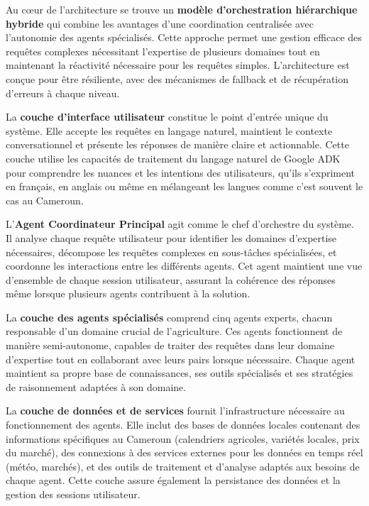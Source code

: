 Au cœur de l'architecture se trouve un \textbf{modèle d'orchestration hiérarchique hybride} qui combine les avantages d'une coordination centralisée avec l'autonomie des agents spécialisés. Cette approche permet une gestion efficace des requêtes complexes nécessitant l'expertise de plusieurs domaines tout en maintenant la réactivité nécessaire pour les requêtes simples. L'architecture est conçue pour être résiliente, avec des mécanismes de fallback et de récupération d'erreurs à chaque niveau.

La \textbf{couche d'interface utilisateur} constitue le point d'entrée unique du système. Elle accepte les requêtes en langage naturel, maintient le contexte conversationnel et présente les réponses de manière claire et actionnable. Cette couche utilise les capacités de traitement du langage naturel de Google ADK pour comprendre les nuances et les intentions des utilisateurs, qu'ils s'expriment en français, en anglais ou même en mélangeant les langues comme c'est souvent le cas au Cameroun.

L'\textbf{Agent Coordinateur Principal} agit comme le chef d'orchestre du système. Il analyse chaque requête utilisateur pour identifier les domaines d'expertise nécessaires, décompose les requêtes complexes en sous-tâches spécialisées, et coordonne les interactions entre les différents agents. Cet agent maintient une vue d'ensemble de chaque session utilisateur, assurant la cohérence des réponses même lorsque plusieurs agents contribuent à la solution.

La \textbf{couche des agents spécialisés} comprend cinq agents experts, chacun responsable d'un domaine crucial de l'agriculture. Ces agents fonctionnent de manière semi-autonome, capables de traiter des requêtes dans leur domaine d'expertise tout en collaborant avec leurs pairs lorsque nécessaire. Chaque agent maintient sa propre base de connaissances, ses outils spécialisés et ses stratégies de raisonnement adaptées à son domaine.

La \textbf{couche de données et de services} fournit l'infrastructure nécessaire au fonctionnement des agents. Elle inclut des bases de données locales contenant des informations spécifiques au Cameroun (calendriers agricoles, variétés locales, prix du marché), des connexions à des services externes pour les données en temps réel (météo, marchés), et des outils de traitement et d'analyse adaptés aux besoins de chaque agent. Cette couche assure également la persistance des données et la gestion des sessions utilisateur.

